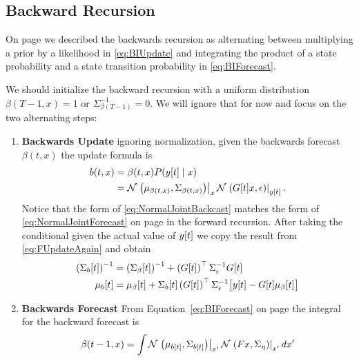 \subsection{Backward Recursion}
\label{sec:DetailBack}

On page \pageref{eq:BIUpdate} we described the backwards recursion as
alternating between multiplying a prior by a likelihood in
\eqref{eq:BIUpdate} and integrating the product of a state probability
and a state transition probability in \eqref{eq:BIForecast}.

We should initialize the backward recursion with a uniform
distribution $\beta(T-1,x) = 1$ or $\Sigma^{-1}_{\beta(T-1)} = 0$.  We
will ignore that for now and focus on the two alternating steps:
\begin{enumerate}
\item \textbf{Backwards Update} ignoring normalization, given the
  backwards forecast $\beta(t,x)$ the update formula is
  \begin{align}
    \nonumber
    b(t,x) &= \beta(t,x) P(y[t] \mid x) \\
    \label{eq:NormalJointBackcast}
           &= {\mathcal{N}}\left.\left(\mu_{\beta(t,x)},\Sigma_{\beta(t,x)}\right)\right|_{x} {\mathcal{N}}\left.\left(G[t]x,\epsilon\right)\right|_{{y}{[t]}}. 
  \end{align}
  Notice that the form of \eqref{eq:NormalJointBackcast} matches the
  form of \eqref{eq:NormalJointForecast} on page
  \pageref{eq:NormalJointForecast} in the forward recursion.  After
  taking the conditional given the actual value of ${y}{[t]}$ we copy
  the result from \eqref{eq:FUpdateAgain} and obtain
    \begin{align*}
      \left( {\Sigma_b}{[t]} \right)^{-1} &= \left(
        {\Sigma_\beta}{[t]} \right)^{-1} + \left( {G}{[t]}
        \right)^\top \Sigma_\epsilon^{-1} {G}{[t]} \\
      {\mu_b}{[t]} &= {\mu_\beta}{[t]} +
      {\Sigma_{b}}{[t]} \left( {G}{[t]} \right)^\top
      \Sigma_\epsilon^{-1} \big[{y}{[t]} - {G}{[t]}
      {\mu_\beta}{[t]}\big]
    \end{align*}
  \item \textbf{Backwards Forecast} From
    Equation~\eqref{eq:BIForecast} on page \pageref{eq:BIForecast} the
    integral for the backward forecast is
    \begin{equation}
      \label{eq:BackwardKIntrgral}
      \beta(t-1,x) = \int
      \NormalE{\mu_{\ti{b}{t}}}{\Sigma_{\ti{b}{t}}}{x'}
      \NormalE{Fx}{\Sigma_\eta}{x'} dx'

\end{equation}
\end{enumerate}
